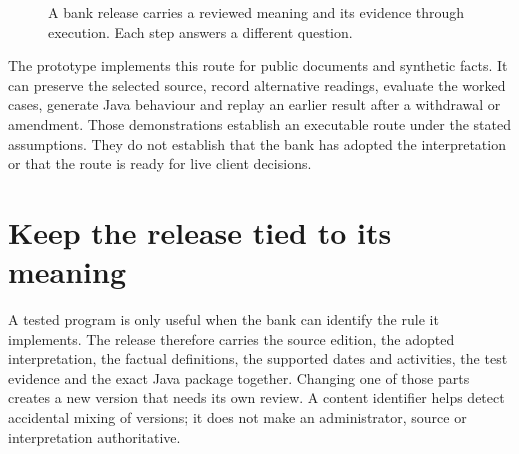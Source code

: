 \documentclass[12pt,a4paper,oneside,openany]{book}
\begin{document}
\begin{figure}[htbp]
\centering
{}
\caption{A bank release carries a reviewed meaning and its evidence through
execution. Each step answers a different question.}
\label{fig:reader-implementation-route}
\end{figure}

The prototype implements this route for public documents and synthetic facts. It
can preserve the selected source, record alternative readings, evaluate the
worked cases, generate Java behaviour and replay an earlier result after a
withdrawal or amendment. Those demonstrations establish an executable route
under the stated assumptions. They do not establish that the bank has adopted
the interpretation or that the route is ready for live client decisions.

\section{Keep the release tied to its meaning}

A tested program is only useful when the bank can identify the rule it implements.
The release therefore carries the source edition, the adopted interpretation,
the factual definitions, the supported dates and activities, the test evidence
and the exact Java package together. Changing one of those parts creates a new
version that needs its own review. A content identifier helps detect accidental
mixing of versions; it does not make an administrator, source or interpretation
authoritative.
\end{document}
